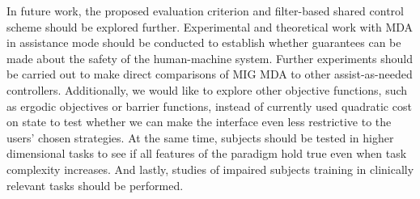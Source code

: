 In future work, the proposed evaluation criterion and filter-based shared control scheme should be explored further. Experimental and theoretical work with MDA in assistance mode should be conducted to establish whether guarantees can be made about the safety of the human-machine system. Further experiments should be carried out to make direct comparisons of MIG MDA to other assist-as-needed controllers. Additionally, we would like to explore other objective functions, such as ergodic objectives or barrier functions, instead of currently used quadratic cost on state to test whether we can make the interface even less restrictive to the users' chosen strategies. At the same time, subjects should be tested in higher dimensional tasks to see if all features of the paradigm hold true even when task complexity increases. And lastly, studies of impaired subjects training in clinically relevant tasks should be performed. 

